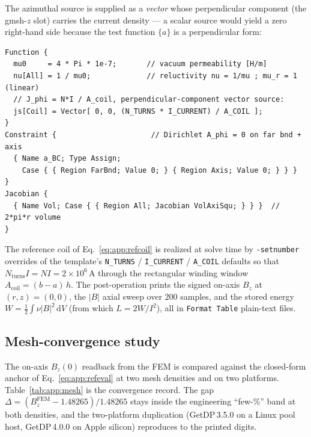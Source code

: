 The azimuthal source is supplied as a \emph{vector} whose perpendicular
component (the gmsh-$z$ slot) carries the current density --- a scalar source
would yield a zero right-hand side because the test function $\{a\}$ is a
perpendicular form:
\begin{lstlisting}
Function {
  mu0     = 4 * Pi * 1e-7;       // vacuum permeability [H/m]
  nu[All] = 1 / mu0;             // reluctivity nu = 1/mu ; mu_r = 1 (linear)
  // J_phi = N*I / A_coil, perpendicular-component vector source:
  js[Coil] = Vector[ 0, 0, (N_TURNS * I_CURRENT) / A_COIL ];
}
Constraint {                      // Dirichlet A_phi = 0 on far bnd + axis
  { Name a_BC; Type Assign;
    Case { { Region FarBnd; Value 0; } { Region Axis; Value 0; } } }
}
Jacobian {
  { Name Vol; Case { { Region All; Jacobian VolAxiSqu; } } }  // 2*pi*r volume
}
\end{lstlisting}

\noindent
The reference coil of Eq.~\eqref{eq:app:refcoil} is realized at solve time by
\verb|-setnumber| overrides of the template's \texttt{N\_TURNS} /
\texttt{I\_CURRENT} / \texttt{A\_COIL} defaults so that $N_{\text{turns}}I =
NI = 2\times10^{6}$\,A through the rectangular winding window $A_{\text{coil}} =
(b-a)\,h$. The post-operation prints the signed on-axis $B_z$ at
$(r,z)=(0,0)$, the $|B|$ axial sweep over $200$ samples, and the stored
energy $W = \tfrac12\!\int\!\nu|B|^2\,\mathrm{d}V$ (from which $L = 2W/I^2$),
all in \texttt{Format Table} plain-text files.

\subsection{Mesh-convergence study}
\label{app:magnet:converge}

The on-axis $B_z(0)$ readback from the FEM is compared against the
closed-form anchor of Eq.~\eqref{eq:app:refeval} at two mesh densities and on
two platforms. Table~\ref{tab:app:mesh} is the convergence record. The gap
$\Delta = (B_z^{\text{FEM}} - 1.48265)/1.48265$ stays inside the engineering
``few-\%'' band at both densities, and the two-platform duplication
(GetDP\,3.5.0 on a Linux pool host, GetDP\,4.0.0 on Apple silicon) reproduces
to the printed digits.

